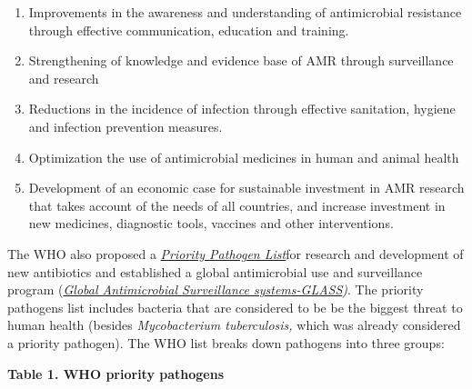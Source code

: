 \documentclass[
  11pt,
  paper=a4,
  ,captions=tableheading
]{scrartcl}
\providecommand{\tightlist}{%
  \setlength{\itemsep}{0pt}\setlength{\parskip}{0pt}}
\begin{document}
\begin{enumerate}
\def\labelenumi{\arabic{enumi}.}
\tightlist
\item
  Improvements in the awareness and understanding of antimicrobial
  resistance through effective communication, education and training.
\item
  Strengthening of knowledge and evidence base of AMR through
  surveillance and research
\item
  Reductions in the incidence of infection through effective sanitation,
  hygiene and infection prevention measures.
\item
  Optimization the use of antimicrobial medicines in human and animal
  health
\item
  Development of an economic case for sustainable investment in AMR
  research that takes account of the needs of all countries, and
  increase investment in new medicines, diagnostic tools, vaccines and
  other interventions.
\end{enumerate}

The WHO also proposed a
\href{https://www.who.int/medicines/publications/WHO-PPL-Short_Summary_25Feb-ET_NM_WHO.pdf}{\emph{Priority
Pathogen List}}for research and development of new antibiotics and
established a global antimicrobial use and surveillance program
(\href{https://www.who.int/initiatives/glass}{\emph{Global Antimicrobial
Surveillance systems-GLASS}}\emph{)}. The priority pathogens list
includes bacteria that are considered to be be the biggest threat to
human health (besides \emph{Mycobacterium tuberculosis,} which was
already considered a priority pathogen). The WHO list breaks down
pathogens into three groups:

\textbf{Table 1. WHO priority pathogens}
\end{document}
